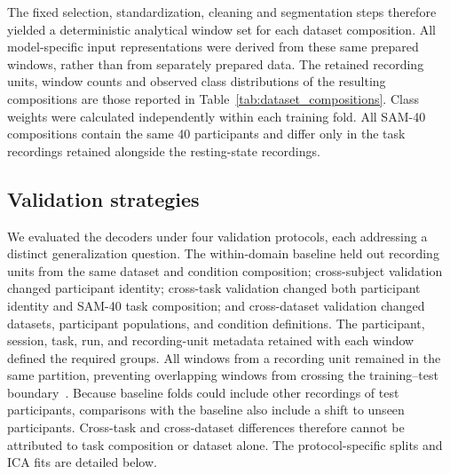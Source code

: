 \documentclass[10pt,letterpaper]{article}
\newcommand{\rev}[1]{#1}
\newcommand{\revs}[1]{#1}
\begin{document}
\rev{The fixed selection, standardization, cleaning and segmentation steps therefore
yielded a deterministic analytical window set for each dataset composition.
All model-specific input representations were derived from these same prepared
windows, rather than from separately prepared data. The retained recording
units, window counts and observed class distributions of the resulting
compositions are those reported in Table~\ref{tab:dataset_compositions}. Class weights were calculated
independently within each training fold. All SAM-40 compositions contain the same 40 participants and
differ only in the task recordings retained alongside the resting-state
recordings.}

\subsection*{\revs{Validation strategies}}

\rev{We evaluated the decoders under four validation protocols, each
addressing a distinct generalization question. The within-domain baseline
held out recording units from the same dataset and condition composition;
cross-subject validation changed participant identity; cross-task validation
changed both participant identity and SAM-40 task composition; and
cross-dataset validation changed datasets, participant populations, and
condition definitions. The participant, session, task, run, and recording-unit
metadata retained with each window defined the required groups. All windows
from a recording unit remained in the same partition, preventing overlapping
windows from crossing the training--test boundary~\cite{chen2025hybrid}.
Because baseline folds could include other recordings of test participants,
comparisons with the baseline also include a shift to unseen participants.
Cross-task and cross-dataset differences therefore cannot be attributed to
task composition or dataset alone. The protocol-specific splits and ICA fits
are detailed below.}
\end{document}

